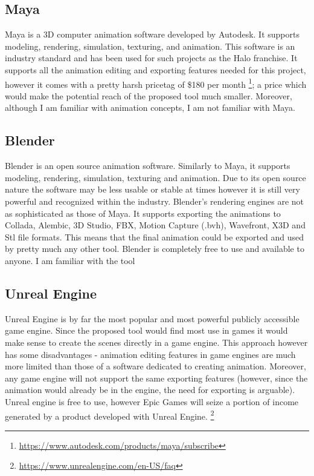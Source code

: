 \subsection{Maya}
Maya is a 3D computer animation software developed by Autodesk. It supports modeling, rendering, simulation, texturing, and animation. This software is an industry standard and has been used for such projects as the Halo franchise. It supports all the animation editing and exporting features needed for this project, however it comes with a pretty harsh pricetag of \$180 per month \footnote{\url{https://www.autodesk.com/products/maya/subscribe}}; a price which would make the potential reach of the proposed tool much smaller. Moreover, although I am familiar with animation concepts, I am not familiar with Maya.


\subsection{Blender}
Blender is an open source animation software. Similarly to Maya, it supports modeling, rendering, simulation, texturing and animation. Due to its open source nature the software may be less usable or stable at times however it is still very powerful and recognized within the industry. Blender's rendering engines are not as sophisticated as those of Maya. It supports exporting the animations to Collada, Alembic, 3D Studio, FBX, Motion Capture (.bvh), Wavefront, X3D and Stl file formats. This means that the final animation could be exported and used by pretty much any other tool. Blender is completely free to use and available to anyone. I am familiar with the tool


\subsection{Unreal Engine}

Unreal Engine is by far the most popular and most powerful publicly accessible game engine. Since the proposed tool would find most use in games it would make sense to create the scenes directly in a game engine. This approach however has some disadvantages - animation editing features in game engines are much more limited than those of a software dedicated to creating animation. Moreover, any game engine will not support the same exporting features (however, since the animation would already be in the engine, the need for exporting is arguable). Unreal engine is free to use, however Epic Games will seize a portion of income generated by a product developed with Unreal Engine. \footnote{\url{https://www.unrealengine.com/en-US/faq}}

